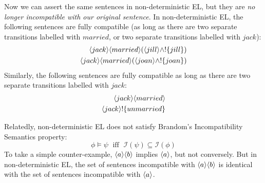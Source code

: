 Now we can assert the same sentences in non-deterministic EL, but they are \emph{no longer incompatible with our original sentence}.
In non-deterministic EL, the following sentences are fully compatible (as long as there are two separate transitions labelled with $married$, or two separate transitions labelled with $jack$):
\begin{eqnarray*}
\langle jack \rangle \langle married \rangle (\langle jill \rangle \land ! \{jill\}) \\
\langle jack \rangle \langle married \rangle (\langle joan \rangle \land ! \{joan\})
\end{eqnarray*}
Similarly, the following sentences are fully compatible as long as there are two separate transitions labelled with $jack$:
\begin{eqnarray*}
\langle jack \rangle \langle married \rangle \\
\langle jack \rangle ! \{unmarried\}
\end{eqnarray*}

Relatedly, non-deterministic EL does not satisfy Brandom's Incompatibility Semantics property:
\[
\phi \models \psi \; \mbox{ iff } \; \mathcal{I}(\psi) \subseteq \mathcal{I}(\phi)
\]
To take a simple counter-example, $\MAY{a}\MAY{b}$ implies $\MAY{a}$, but not conversely.
But in non-deterministic EL, the set of sentences incompatible with $\MAY{a}\MAY{b}$ is identical with the set of sentences incompatible with  $\MAY{a}$.




